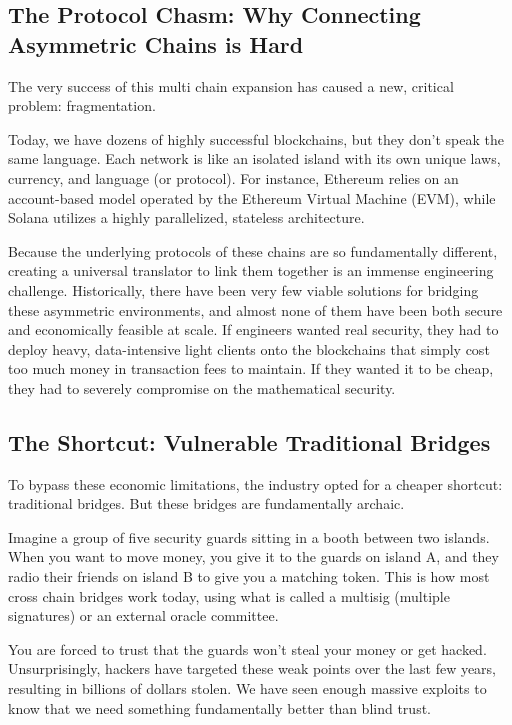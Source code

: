 \documentclass[11pt,a4paper]{article}
\begin{document}
\subsection{The Protocol Chasm: Why Connecting Asymmetric Chains is Hard}
The very success of this multi chain expansion has caused a new, critical problem: fragmentation. 

Today, we have dozens of highly successful blockchains, but they don't speak the same language. Each network is like an isolated island with its own unique laws, currency, and language (or protocol). For instance, Ethereum relies on an account-based model operated by the Ethereum Virtual Machine (EVM), while Solana utilizes a highly parallelized, stateless architecture. 

Because the underlying protocols of these chains are so fundamentally different, creating a universal translator to link them together is an immense engineering challenge. Historically, there have been very few viable solutions for bridging these asymmetric environments, and almost none of them have been both secure and economically feasible at scale. If engineers wanted real security, they had to deploy heavy, data-intensive light clients onto the blockchains that simply cost too much money in transaction fees to maintain. If they wanted it to be cheap, they had to severely compromise on the mathematical security.

\subsection{The Shortcut: Vulnerable Traditional Bridges}
To bypass these economic limitations, the industry opted for a cheaper shortcut: traditional bridges. But these bridges are fundamentally archaic. 

Imagine a group of five security guards sitting in a booth between two islands. When you want to move money, you give it to the guards on island A, and they radio their friends on island B to give you a matching token. This is how most cross chain bridges work today, using what is called a multisig (multiple signatures) or an external oracle committee. 

You are forced to trust that the guards won't steal your money or get hacked. Unsurprisingly, hackers have targeted these weak points over the last few years, resulting in billions of dollars stolen. We have seen enough massive exploits to know that we need something fundamentally better than blind trust.
\end{document}
